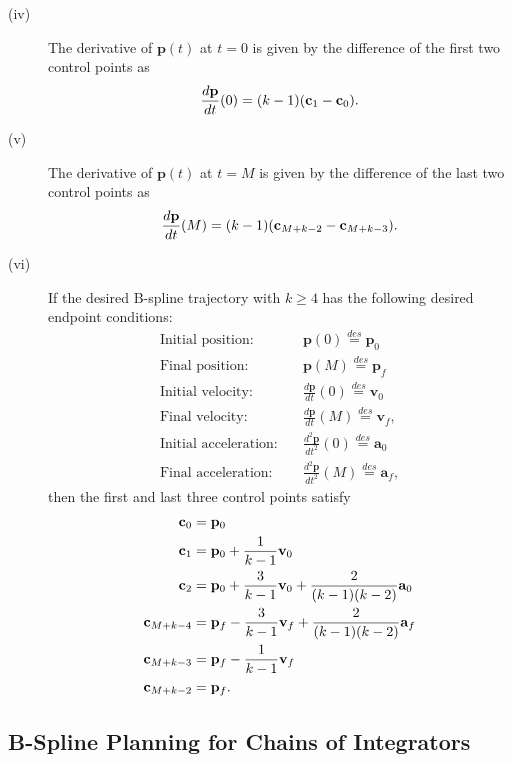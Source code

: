 \begin{corollary}
\begin{description}
\[		\]
	\item[(iv)] The derivative of $\mathbf{p}(t)$ at $t=0$ is given by the difference of the first two control points as
		\[
			\frac{d\mathbf{p}}{dt}(0) = (k-1)(\mathbf{c}_1 - \mathbf{c}_0).
		\]
	\item[(v)] The derivative of $\mathbf{p}(t)$ at $t=M$ is given by the difference of the last two control points as
		\[
			\frac{d\mathbf{p}}{dt}(M) = (k-1)(\mathbf{c}_{M+k-2} - \mathbf{c}_{M+k-3}).
		\]
	\item[(vi)] If the desired B-spline trajectory with $k\geq 4$ has the following desired endpoint conditions:
		\begin{align*}
			\text{Initial position:} &\quad \mathbf{p}(0) \stackrel{des}{=} \mathbf{p}_0 \\	
			\text{Final position:} &\quad \mathbf{p}(M) \stackrel{des}{=} \mathbf{p}_f \\
			\text{Initial velocity:} &\quad \frac{d\mathbf{p}}{dt}(0) \stackrel{des}{=} \mathbf{v}_0 \\	
			\text{Final velocity:} &\quad \frac{d\mathbf{p}}{dt}(M) \stackrel{des}{=} \mathbf{v}_f, \\
			\text{Initial acceleration:} &\quad \frac{d^2\mathbf{p}}{dt^2}(0) \stackrel{des}{=} \mathbf{a}_0 \\	
			\text{Final acceleration:} &\quad \frac{d^2\mathbf{p}}{dt^2}(M) \stackrel{des}{=} \mathbf{a}_f,
		\end{align*}
		then the first and last three control points satisfy
		\begin{align*}
			\mathbf{c}_0 &= \mathbf{p}_0 \\
			\mathbf{c}_1 &= \mathbf{p}_0 + \frac{1}{k-1} \mathbf{v}_0 \\
			\mathbf{c}_2 &= \mathbf{p}_0 + \frac{3}{k-1} \mathbf{v}_0 + \frac{2}{(k-1)(k-2)}\mathbf{a}_0 \\
			\mathbf{c}_{M+k-4} &= \mathbf{p}_f - \frac{3}{k-1}\mathbf{v}_f + \frac{2}{(k-1)(k-2)}\mathbf{a}_f \\
			\mathbf{c}_{M+k-3} &= \mathbf{p}_f - \frac{1}{k-1}\mathbf{v}_f \\
			\mathbf{c}_{M+k-2} &= \mathbf{p}_f.
		\end{align*}
	\end{description}
\end{corollary}



\subsection{B-Spline Planning for Chains of Integrators}

